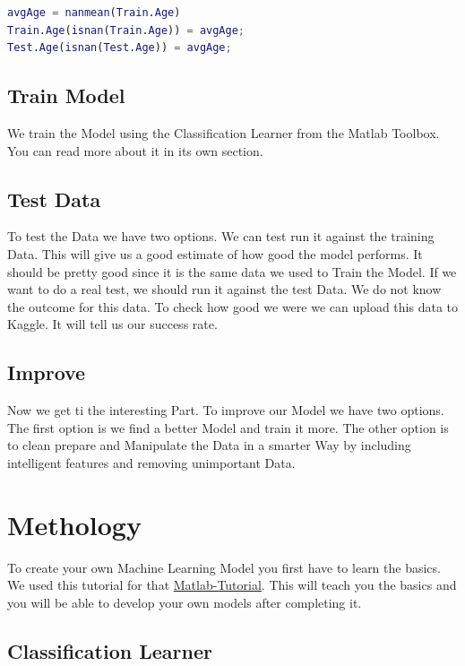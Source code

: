 \documentclass[
   10.5pt,
   invert-title=true,
   titlepage=false,
   titleimage-ratio=13,
   class=article
]{bfhpub}				%
\begin{document}
\begin{lstlisting}[language=Matlab]
avgAge = nanmean(Train.Age)          
Train.Age(isnan(Train.Age)) = avgAge;  
Test.Age(isnan(Test.Age)) = avgAge;    
\end{lstlisting}

\subsection*{Train Model}
We train the Model using the Classification Learner from the Matlab Toolbox. You can read more about it in its own section. 
 
\subsection*{Test Data}
To test the Data we have two options. We can test run it against the training Data. This will give us a good estimate of how good the model performs. It should be pretty good since it is the same data we used to Train the Model. If we want to do a real test, we should run it against the test Data. We do not know the outcome for this data. To check how good we were we can upload this data to Kaggle. It will tell us our success rate. 

\subsection*{Improve}
Now we get ti the interesting Part. To improve our Model we have two options. The first option is we find a better Model and train it more. The other option is to clean prepare and Manipulate the Data in a smarter Way by including intelligent features and removing unimportant Data.


\section*{Methology}
To create your own Machine Learning Model you first have to learn the basics. We used this tutorial for that \href{https://blogs.mathworks.com/loren/2015/06/18/getting-started-with-kaggle-data-science-competitions/}{Matlab-Tutorial}.
This will teach you the basics and you will be able to develop your own models after completing it.

\subsection*{Classification Learner}
\end{document}
